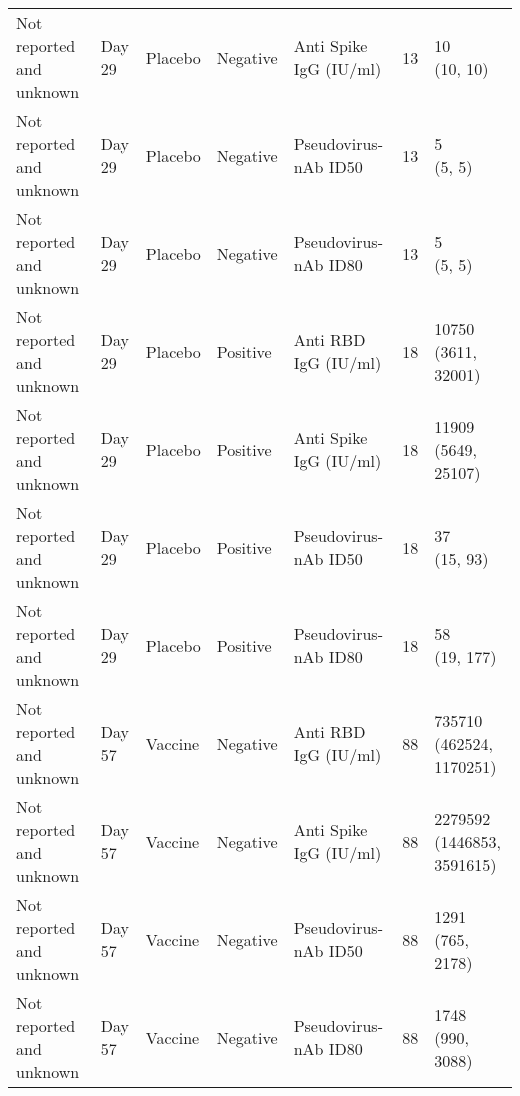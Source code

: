 \documentclass[]{book}
\theoremstyle{definition}
\theoremstyle{definition}
\theoremstyle{definition}
\newcommand{\1}{\mathbbm{1}}
\begin{document}
\begin{landscape}
\begin{ThreePartTable}
\begin{longtable}[t]{>{\raggedright\arraybackslash}p{7cm}llllll}
\hspace{1em}Not reported and unknown & Day 29 & Placebo & Negative & Anti Spike IgG (IU/ml) & 13 & \makecell[l]{10\\(10, 10)}\\
\hspace{1em}Not reported and unknown & Day 29 & Placebo & Negative & Pseudovirus-nAb ID50 & 13 & \makecell[l]{5\\(5, 5)}\\
\hspace{1em}Not reported and unknown & Day 29 & Placebo & Negative & Pseudovirus-nAb ID80 & 13 & \makecell[l]{5\\(5, 5)}\\
\hspace{1em}Not reported and unknown & Day 29 & Placebo & Positive & Anti RBD IgG (IU/ml) & 18 & \makecell[l]{10750\\(3611, 32001)}\\
\hspace{1em}Not reported and unknown & Day 29 & Placebo & Positive & Anti Spike IgG (IU/ml) & 18 & \makecell[l]{11909\\(5649, 25107)}\\
\hspace{1em}Not reported and unknown & Day 29 & Placebo & Positive & Pseudovirus-nAb ID50 & 18 & \makecell[l]{37\\(15, 93)}\\
\hspace{1em}Not reported and unknown & Day 29 & Placebo & Positive & Pseudovirus-nAb ID80 & 18 & \makecell[l]{58\\(19, 177)}\\
\hspace{1em}Not reported and unknown & Day 57 & Vaccine & Negative & Anti RBD IgG (IU/ml) & 88 & \makecell[l]{735710\\(462524, 1170251)}\\
\hspace{1em}Not reported and unknown & Day 57 & Vaccine & Negative & Anti Spike IgG (IU/ml) & 88 & \makecell[l]{2279592\\(1446853, 3591615)}\\
\hspace{1em}Not reported and unknown & Day 57 & Vaccine & Negative & Pseudovirus-nAb ID50 & 88 & \makecell[l]{1291\\(765, 2178)}\\
\hspace{1em}Not reported and unknown & Day 57 & Vaccine & Negative & Pseudovirus-nAb ID80 & 88 & \makecell[l]{1748\\(990, 3088)}\\

\end{longtable}
\end{ThreePartTable}
\end{landscape}
\end{document}
